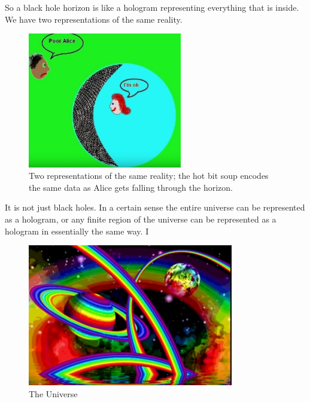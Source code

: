 \documentclass[]{article}
\begin{document}
So a black hole horizon is like a hologram representing everything that is inside. We have two representations of the same reality.

\begin{figure}[H]
	\begin{center}
		\caption[Two representations of the same reality]{Two representations of the same reality; the hot bit soup encodes the same data as Alice gets falling through the horizon.}
		\includegraphics[width=0.6\textwidth]{wh-2reps}
	\end{center}
\end{figure}

It is not just black holes. In a certain sense the entire universe can be represented as a hologram, or any finite region of the universe can be represented as a hologram in essentially the same way. I

\begin{figure}[H]
	\begin{center}
		\caption{The Universe}
		\includegraphics[width=0.8\textwidth]{wh-universe}
	\end{center}
\end{figure}
\end{document}

